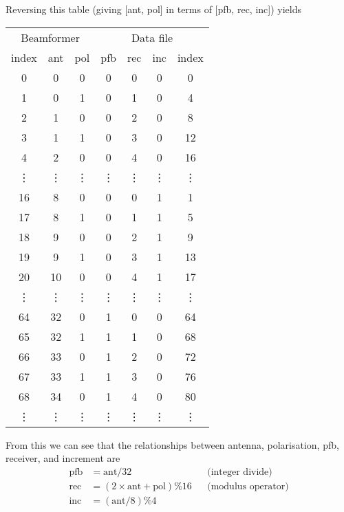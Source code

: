 \documentclass{article}
\begin{document}
\newpage
\noindent Reversing this table (giving [ant, pol] in terms of [pfb, rec, inc]) yields
\begin{table}[!h]
    \centering
    \begin{tabular}{ccc|cccc}
        \multicolumn{3}{c}{Beamformer} & \multicolumn{4}{c}{Data file} \\
        index & ant & pol & pfb & rec & inc & index \\
        \hline
        0 &  0 & 0 & 0 & 0 & 0 & 0 \\
        1 &  0 & 1 & 0 & 1 & 0 & 4 \\
        2 &  1 & 0 & 0 & 2 & 0 & 8 \\
        3 &  1 & 1 & 0 & 3 & 0 & 12 \\
        4 &  2 & 0 & 0 & 4 & 0 & 16 \\
        \vdots & \vdots & \vdots & \vdots & \vdots & \vdots & \vdots \\
        16 &  8 & 0 & 0 & 0 & 1 & 1 \\
        17 &  8 & 1 & 0 & 1 & 1 & 5 \\
        18 &  9 & 0 & 0 & 2 & 1 & 9 \\
        19 &  9 & 1 & 0 & 3 & 1 & 13 \\
        20 & 10 & 0 & 0 & 4 & 1 & 17 \\
        \vdots & \vdots & \vdots & \vdots & \vdots & \vdots & \vdots \\
         64 & 32 & 0 & 1 & 0 & 0 & 64 \\
         65 & 32 & 1 & 1 & 1 & 0 & 68 \\
         66 & 33 & 0 & 1 & 2 & 0 & 72 \\
         67 & 33 & 1 & 1 & 3 & 0 & 76 \\
         68 & 34 & 0 & 1 & 4 & 0 & 80 \\
        \vdots & \vdots & \vdots & \vdots & \vdots & \vdots & \vdots \\
    \end{tabular}
\end{table}

\noindent From this we can see that the relationships between antenna, polarisation, pfb, receiver, and increment are
\begin{align*}
    \text{pfb} &= \text{ant} / 32 & & \text{(integer divide)} \\
    \text{rec} &= (2\times\text{ant}+\text{pol}) \% 16 & & \text{(modulus operator)} \\
    \text{inc} &= (\text{ant} / 8) \% 4
\end{align*}
\end{document}
